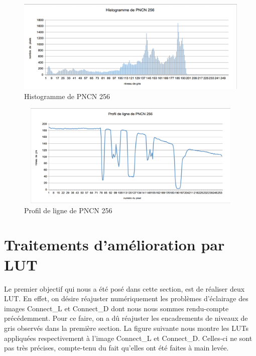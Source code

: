 \documentclass{scrreprt}
\begin{document}
\begin{figure}[!h]
\centering
\includegraphics[width=15cm]{images/histogramme2.png}
\caption{Histogramme de PNCN 256}
\end{figure}

\begin{figure}[!h]
\centering
\includegraphics[height=5cm,width=15cm]{images/profildeligne2.png}
\caption{Profil de ligne de PNCN 256}
\end{figure}

\newpage
\section{Traitements d'amélioration par LUT}

Le premier objectif qui nous a été posé dans cette section, est de réaliser deux LUT. 
En effet, on désire réajuster numériquement les problèmes d'éclairage des images 
Connect_L et Connect_D dont nous nous sommes rendu-compte précédemment. 
Pour ce faire, on a dû réajuster les encadrements de niveaux de gris observés dans la
première section. La figure suivante nous montre les LUTs appliquées respectivement à 
l'image Connect_L et Connect_D. Celles-ci ne sont pas très précises, compte-tenu du 
fait qu'elles ont été faites à main levée.  
\end{document}
